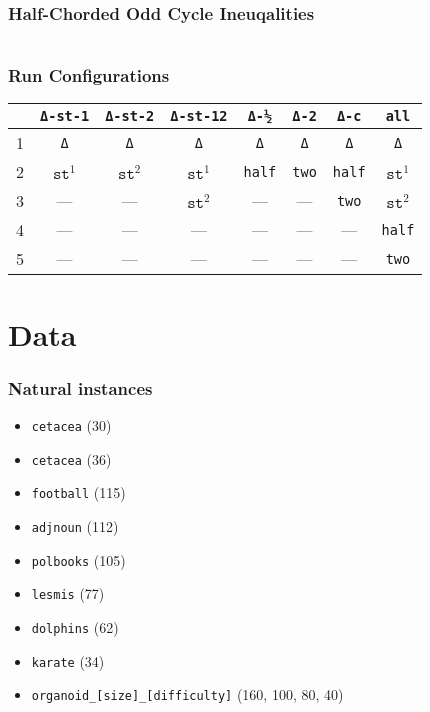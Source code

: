 \documentclass{beamer}
\begin{document}
\begin{frame}
	\frametitle{Half-Chorded Odd Cycle Ineuqalities}	
	\begin{columns}
		\begin{column}{0.5\textwidth}
		
	\end{column}
	\end{columns}
	\note[item]{}
\end{frame}

\begin{frame}
	\frametitle{Run Configurations}
\begin{table}
\centering
\begin{tabular}{lccccccc}
\toprule
  & \texttt{Δ-st-1} & \texttt{Δ-st-2} & \texttt{Δ-st-12}	& \texttt{Δ-½}	& \texttt{Δ-2} 	& \texttt{Δ-c}	& \texttt{all}  	\\
\midrule
1 & \texttt{Δ}      & \texttt{Δ}      & \texttt{Δ}      	& \texttt{Δ}	& \texttt{Δ}	& \texttt{Δ}	& \texttt{Δ} 		\\
2 & $\texttt{st}^1$ & $\texttt{st}^2$ & $\texttt{st}^1$ 	& \texttt{half}	& \texttt{two} 	& \texttt{half}	& $\texttt{st}^1$  	\\
3 & —               & —               & $\texttt{st}^2$ 	& —    			& —   		   	& \texttt{two}  & $\texttt{st}^2$  	\\
4 & —               & —               & —               	& —    			& —   		   	& —      		& \texttt{half}     \\
5 & —               & —               & —               	& —    			& — 			& —      		& \texttt{two}      \\
\bottomrule
\end{tabular}
\end{table}
\end{frame}

\section{Data}
\begin{frame}
	\frametitle{Natural instances}	
	\begin{itemize}
		\item<1-> \texttt{cetacea} (30)
		\item<1-> \texttt{cetacea} (36)
		\item<2-> \texttt{football} (115)
		\item<2-> \texttt{adjnoun} (112)
		\item<2-> \texttt{polbooks} (105)
		\item<2-> \texttt{lesmis} (77)
		\item<2-> \texttt{dolphins} (62)
		\item<2-> \texttt{karate} (34)
		\item<3-> \texttt{organoid\_[size]\_[difficulty]} (160, 100, 80, 40)
	\end{itemize}
\end{frame}
\end{document}
